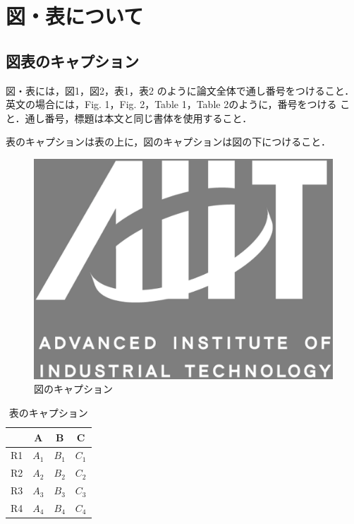 \documentclass[a4j, 12Q, twocolumn, twoside]{jsarticle}
\begin{document}
\section{図・表について}
\subsection{図表のキャプション}
図・表には，図1，図2，表1，表2 のように論文全体で通し番号をつけること．
英文の場合には，Fig. 1，Fig. 2，Table 1，Table 2のように，番号をつける
こと．通し番号，標題は本文と同じ書体を使用すること．

表のキャプションは表の上に，図のキャプションは図の下につけること．

\begin{figure}
 \begin{center}
  \includegraphics[width=0.8\linewidth]{aiit_symbol.eps}
 \end{center}
 \caption{図のキャプション}
 \label{fig:one}
 \vskip 3pt %
\end{figure}

\begin{table}
 \caption{表のキャプション}
 \begin{center}
  \begin{tabular}{c|ccc} \hline \hline
   & A & B & C \\ \hline
   R1 & $A_{1}$ & $B_{1}$ & $C_{1}$ \\
   R2 & $A_{2}$ & $B_{2}$ & $C_{2}$ \\
   R3 & $A_{3}$ & $B_{3}$ & $C_{3}$ \\
   R4 & $A_{4}$ & $B_{4}$ & $C_{4}$ \\ \hline
  \end{tabular}
 \end{center}
 \vskip -4pt %
\end{table}
\end{document}
